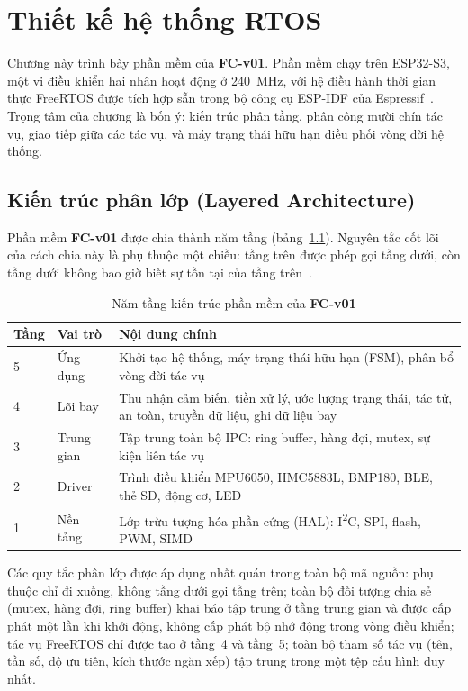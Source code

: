 \chapter{Thiết kế hệ thống RTOS}

Chương này trình bày phần mềm của \textbf{FC-v01}. Phần mềm chạy trên ESP32-S3, một vi điều khiển hai nhân hoạt động ở 240~MHz, với hệ điều hành thời gian thực FreeRTOS được tích hợp sẵn trong bộ công cụ ESP-IDF của Espressif~\cite{idf-freertos}. Trọng tâm của chương là bốn ý: kiến trúc phân tầng, phân công mười chín tác vụ, giao tiếp giữa các tác vụ, và máy trạng thái hữu hạn điều phối vòng đời hệ thống.

\section{Kiến trúc phân lớp (Layered Architecture)}

Phần mềm \textbf{FC-v01} được chia thành năm tầng (bảng~\ref{tab:layers}). Nguyên tắc cốt lõi của cách chia này là phụ thuộc một chiều: tầng trên được phép gọi tầng dưới, còn tầng dưới không bao giờ biết sự tồn tại của tầng trên~\cite{rico2022}.

\begin{table}[h]
\centering
\caption{Năm tầng kiến trúc phần mềm của \textbf{FC-v01}}
\label{tab:layers}
\small
\begin{tabular}{p{1.1cm}p{4.6cm}p{8.4cm}}
\toprule
Tầng & Vai trò & Nội dung chính \\
\midrule
5 & Ứng dụng & Khởi tạo hệ thống, máy trạng thái hữu hạn (FSM), phân bổ vòng đời tác vụ \\
4 & Lõi bay & Thu nhận cảm biến, tiền xử lý, ước lượng trạng thái, tác tử, an toàn, truyền dữ liệu, ghi dữ liệu bay \\
3 & Trung gian & Tập trung toàn bộ IPC: ring buffer, hàng đợi, mutex, sự kiện liên tác vụ \\
2 & Driver & Trình điều khiển MPU6050, HMC5883L, BMP180, BLE, thẻ SD, động cơ, LED \\
1 & Nền tảng & Lớp trừu tượng hóa phần cứng (HAL): I\textsuperscript{2}C, SPI, flash, PWM, SIMD \\
\bottomrule
\end{tabular}
\end{table}

Các quy tắc phân lớp được áp dụng nhất quán trong toàn bộ mã nguồn: phụ thuộc chỉ đi xuống, không tầng dưới gọi tầng trên; toàn bộ đối tượng chia sẻ (mutex, hàng đợi, ring buffer) khai báo tập trung ở tầng trung gian và được cấp phát một lần khi khởi động, không cấp phát bộ nhớ động trong vòng điều khiển; tác vụ FreeRTOS chỉ được tạo ở tầng~4 và tầng~5; toàn bộ tham số tác vụ (tên, tần số, độ ưu tiên, kích thước ngăn xếp) tập trung trong một tệp cấu hình duy nhất.

